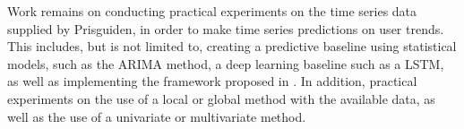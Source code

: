   Work remains on conducting practical experiments on the time series data supplied by Prisguiden,
  in order to make time series predictions on user trends.
  This includes, but is not limited to, creating a predictive baseline using statistical models, such as the ARIMA method, a deep learning baseline such as a LSTM,
  as well as implementing the framework proposed in .
  In addition, practical experiments on the use of a local or global method with the available data,
  as well as the use of a univariate or multivariate method.
\fi
